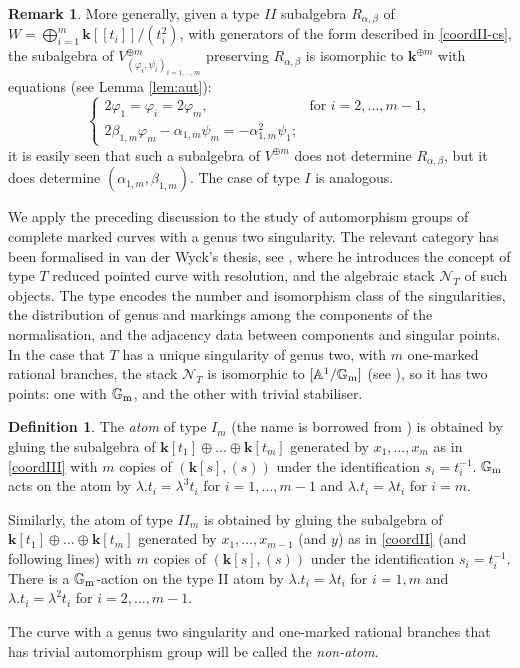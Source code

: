 \documentclass[11pt]{amsart}
\renewcommand{\k}{\mathbf k}
\newcommand{\Aaff}{\mathbb A}
\newcommand{\Gm}{\mathbb{G}_{\rm{m}}}
\theoremstyle{plain}
\theoremstyle{definition}
\newtheorem{dfn}[thm]{Definition}
\newtheorem{rem}[thm]{Remark}
\begin{document}
\begin{rem}
 More generally, given a type $I\!I$ subalgebra $R_{\alpha,\beta}$ of $W=\bigoplus_{i=1}^m\k[\![t_i]\!]/(t_i^2)$, with generators of the form described in \eqref{coordII-cs}, the subalgebra of $V^{\oplus m}_{(\varphi_i,\psi_i)_{i=1,\ldots,m}}$ preserving $R_{\alpha,\beta}$ is isomorphic to $\k^{\oplus m}$ with equations (see Lemma \ref{lem:aut}):
 \[\begin{cases} 2\varphi_1=\varphi_i=2\varphi_m, & \text{for } i=2,\ldots,m-1,\\ 2\beta_{1,m}\varphi_m-\alpha_{1,m}\psi_m=-\alpha_{1,m}^2\psi_1;\end{cases}\]
 it is easily seen that such a subalgebra of $V^{\oplus m}$ does not determine $R_{\alpha,\beta}$, but it does determine $(\alpha_{1,m},\beta_{1,m})$. The case of type $I$ is analogous.
\end{rem}

We apply the preceding discussion to the study of automorphism groups of complete marked curves with a genus two singularity. The relevant category has been formalised in van der Wyck's thesis, see \cite[Proposition 1.102, Theorem 1.105 and Corollary 1.106]{vdW}, where he introduces the concept of type $T$ reduced pointed curve with resolution, and the algebraic stack $\mathcal N_T$ of such objects. The type encodes the number and isomorphism class of the singularities, the distribution of genus and markings among the components of the normalisation, and the adjacency data between components and singular points. In the case that $T$ has a unique singularity of genus two, with $m$ one-marked rational branches, the stack $\mathcal N_T$ is isomorphic to $[\Aaff^1/\Gm]$ (see \cite[Examples 1.111-112]{vdW}), so it has two points: one with $\Gm$, and the other with trivial stabiliser.

\begin{dfn}
 The \emph{atom} of type $I_m$ (the name is borrowed from \cite{AFS1}) is obtained by gluing the subalgebra of $\k[t_1]\oplus\ldots\oplus\k[t_m]$ generated by $x_1,\ldots,x_m$ as in \eqref{coordIII} with $m$ copies of $(\k[s],(s))$ under the identification $s_i=t_i^{-1}$. $\Gm$ acts on the  atom by $\lambda.t_i=\lambda^3 t_i$ for $i=1,\ldots,m-1$ and $\lambda.t_i=\lambda t_i$ for $i=m$.
 
 Similarly, the atom of type $I\!I_m$ is obtained by gluing the subalgebra of $\k[t_1]\oplus\ldots\oplus\k[t_m]$ generated by $x_1,\ldots,x_{m-1}$ (and $y$) as in \eqref{coordII} (and following lines) with $m$ copies of $(\k[s],(s))$ under the identification $s_i=t_i^{-1}$. There is a $\Gm$-action on the type II atom by $\lambda.t_i=\lambda t_i$ for $i=1,m$ and $\lambda.t_i=\lambda^2 t_i$ for $i=2,\ldots,m-1$.
 
 The curve with a genus two singularity and one-marked rational branches that has trivial automorphism group will be called the \emph{non-atom}.
\end{dfn}
\end{document}
